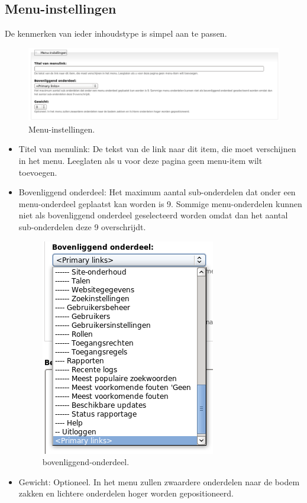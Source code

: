 \subsection{Menu-instellingen} 
De kenmerken van ieder inhoudstype is simpel aan te passen.
 \begin{figure}[!h]
    \centering
   \includegraphics[scale=0.3,angle=0]{menu-instellingen}
   \caption{Menu-instellingen.\label{white}}
 \end{figure}
\begin{itemize}
  \item  Titel van menulink:  De tekst van de link
   naar dit item, die moet verschijnen in het menu. Leeglaten als u
  voor deze pagina geen menu-item wilt toevoegen.
  \item  Bovenliggend onderdeel: Het maximum aantal sub-onderdelen dat onder een
  menu-onderdeel geplaatst kan worden is 9. Sommige menu-onderdelen kunnen niet als bovenliggend 
  onderdeel geselecteerd worden omdat dan het aantal sub-onderdelen deze 9 overschrijdt.
  \begin{figure}[!h]
    \centering
   \includegraphics[scale=0.3,angle=0]{bovenliggend-onderdeel}
   \caption{bovenliggend-onderdeel.\label{white}}
 \end{figure}
  \item  Gewicht: Optioneel. In het menu zullen zwaardere onderdelen naar de
  bodem zakken en lichtere onderdelen hoger worden gepositioneerd.
\end{itemize}

